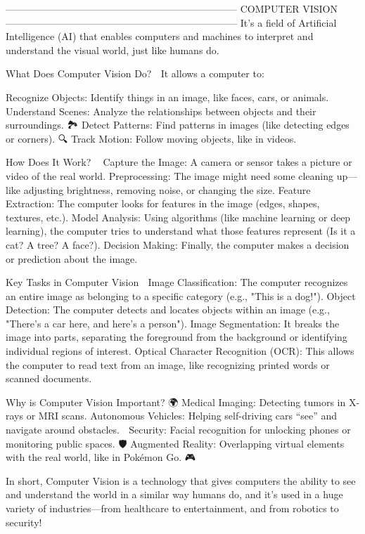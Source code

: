 -----------------------------------------------------------------------
COMPUTER VISION🧑‍💻👀
-----------------------------------------------------------------------
It’s a field of Artificial Intelligence (AI) that enables computers and machines to interpret and understand the visual world, just like humans do.

What Does Computer Vision Do? 🤔
It allows a computer to:

Recognize Objects: Identify things in an image, like faces, cars, or animals. 🦁🚗
Understand Scenes: Analyze the relationships between objects and their surroundings. 🏞️
Detect Patterns: Find patterns in images (like detecting edges or corners). 🔍
Track Motion: Follow moving objects, like in videos. 🎥

How Does It Work? 🧠💡
Capture the Image: A camera or sensor takes a picture or video of the real world.
Preprocessing: The image might need some cleaning up—like adjusting brightness, removing noise, or changing the size.
Feature Extraction: The computer looks for features in the image (edges, shapes, textures, etc.).
Model Analysis: Using algorithms (like machine learning or deep learning), the computer tries to understand what those features represent (Is it a cat? A tree? A face?).
Decision Making: Finally, the computer makes a decision or prediction about the image.

Key Tasks in Computer Vision 🌟
Image Classification: The computer recognizes an entire image as belonging to a specific category (e.g., "This is a dog!").
Object Detection: The computer detects and locates objects within an image (e.g., "There’s a car here, and here’s a person").
Image Segmentation: It breaks the image into parts, separating the foreground from the background or identifying individual regions of interest.
Optical Character Recognition (OCR): This allows the computer to read text from an image, like recognizing printed words or scanned documents. 📜

Why is Computer Vision Important? 🌍
Medical Imaging: Detecting tumors in X-rays or MRI scans.
Autonomous Vehicles: Helping self-driving cars “see” and navigate around obstacles. 🚗
Security: Facial recognition for unlocking phones or monitoring public spaces. 🛡️
Augmented Reality: Overlapping virtual elements with the real world, like in Pokémon Go. 🎮

In short, Computer Vision is a technology that gives computers the ability to see and understand the world in a similar way humans do, and it's used in a huge variety of industries—from healthcare to entertainment, and from robotics to security! 🌟

